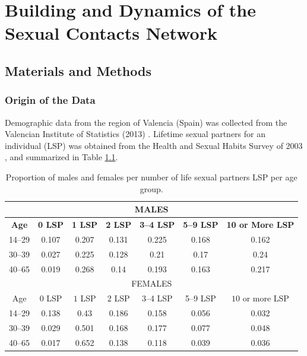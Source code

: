 \chapter{Building and Dynamics of the Sexual Contacts Network}\label{ConstruccionYDinamica}

\section{Materials and Methods}
\vspace{-6pt}

\subsection{Origin of the Data}

Demographic data from the region of Valencia (Spain) was collected from the Valencian Institute of Statistics (2013)  \cite{IVE}.
Lifetime sexual partners for an individual (LSP) was obtained from the Health and Sexual Habits Survey of 2003 \cite{INE}, and 
summarized in Table \ref{table1}. 

\begin{table}[H]
\centering
\begin{tabular}{ccccccc}
\toprule
\multicolumn{7}{c}{\textbf{MALES}} \\ \midrule
\textbf{ Age} & \textbf{0 LSP} & \textbf{1 LSP} &\textbf{ 2 LSP} & \textbf{3--4 LSP} & \textbf{5--9 LSP} & \textbf{10 or More LSP} \\
\midrule
14--29 & 0.107 & 0.207 & 0.131 & 0.225 & 0.168 & 0.162 \\
30--39 & 0.027 & 0.225 & 0.128 & 0.21 & 0.17 & 0.24 \\
40--65 & 0.019 & 0.268 & 0.14 & 0.193 & 0.163 & 0.217 \\
 \midrule 
 
\multicolumn{7}{c}{FEMALES} \\ \midrule
  Age & $0$ LSP & $1$ LSP & $2$ LSP & 3--4 LSP & 5--9 LSP & $10$ or more LSP \\
 \midrule
14--29 & 0.138 & 0.43 & 0.186 & 0.158 & 0.056 & 0.032 \\
30--39 & 0.029 & 0.501 & 0.168 & 0.177 & 0.077 & 0.048 \\
40--65 & 0.017 & 0.652 & 0.138 & 0.118 & 0.039 & 0.036 \\
\bottomrule
\end{tabular} 
\caption{Proportion of males and females per number of life sexual partners {LSP} per age group.}
\label{table1} 
\end{table}

